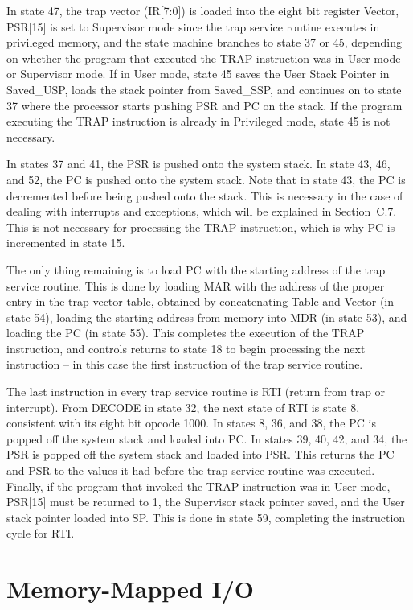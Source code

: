 \documentclass{patt}
\begin{document}
In state 47, the trap vector (IR[7:0]) is loaded into the eight bit
register Vector, PSR[15] is set to Supervisor mode since the trap service 
routine executes in privileged memory, and the state machine branches to 
state 37 or 45, depending on whether the program that executed the TRAP
instruction was in User mode or Supervisor mode.  If in User mode, state 45
saves the User Stack Pointer in Saved\_USP, loads the stack pointer from
Saved\_SSP, and continues on to state 37 where the processor starts pushing
PSR and PC on the stack.  If the program executing the TRAP instruction is
already in Privileged mode, state 45 is not necessary.

In states 37 and 41, the PSR is pushed onto the system stack.  In state 43, 46,
and 52, the PC is pushed onto the system stack.  Note that in state 43, the
PC is decremented before being pushed onto the stack.  This is necessary in the
case of dealing with interrupts and exceptions, which will be explained in
Section~C.7.  This is not necessary for processing the TRAP instruction, which
is why PC is incremented in state 15.

The only thing remaining is to load PC with the starting address of the trap
service routine.  This is done by loading MAR with the address of the proper
entry in the trap vector table, obtained by concatenating Table and Vector 
(in state 54), loading the starting address from memory into MDR (in state 53),
and loading the PC (in state 55).  This completes the execution of the TRAP
instruction, and controls returns to state 18 to begin processing the next
instruction -- in this case the first instruction of the trap service routine.

The last instruction in every trap service routine is RTI (return from
trap or interrupt).  From DECODE in state 32, the next state of RTI is state 8,
consistent with its eight bit opcode 1000.  In states 8, 36, and 38, the PC
is popped off the system stack and loaded into PC.  In states 39, 40, 42, and
34, the PSR is popped off the system stack and loaded into PSR.  This returns 
the PC and PSR to the values it had before the trap service routine was 
executed.  Finally, if the program that invoked the TRAP instruction was in
User mode, PSR[15] must be returned to 1, the Supervisor stack pointer saved,
and the User stack pointer loaded into SP.  This is done in state 59, completing
the instruction cycle for RTI.

\section{Memory-Mapped I/O}
\end{document}
